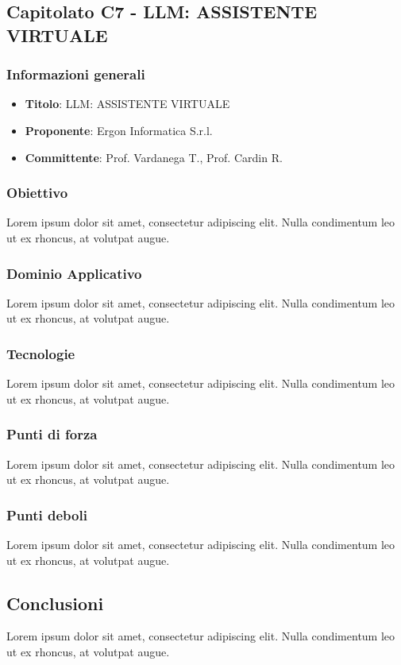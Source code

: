 \subsection{Capitolato C7 - LLM: ASSISTENTE VIRTUALE}
     \subsubsection{Informazioni generali}
        \begin{itemize}
            \item \textbf{Titolo}: LLM: ASSISTENTE VIRTUALE
            \item \textbf{Proponente}: Ergon Informatica S.r.l.
            \item \textbf{Committente}: Prof. Vardanega T., Prof. Cardin R.
        \end{itemize}
    \subsubsection{Obiettivo}
    Lorem ipsum dolor sit amet, consectetur adipiscing elit. Nulla condimentum leo ut ex rhoncus, at volutpat augue.
     \subsubsection{Dominio Applicativo}
    Lorem ipsum dolor sit amet, consectetur adipiscing elit. Nulla condimentum leo ut ex rhoncus, at volutpat augue.
    \subsubsection{Tecnologie}
    Lorem ipsum dolor sit amet, consectetur adipiscing elit. Nulla condimentum leo ut ex rhoncus, at volutpat augue.
    \subsubsection{Punti di forza}
    Lorem ipsum dolor sit amet, consectetur adipiscing elit. Nulla condimentum leo ut ex rhoncus, at volutpat augue.
    \subsubsection{Punti deboli}
    Lorem ipsum dolor sit amet, consectetur adipiscing elit. Nulla condimentum leo ut ex rhoncus, at volutpat augue.
    \subsection{Conclusioni}
    Lorem ipsum dolor sit amet, consectetur adipiscing elit. Nulla condimentum leo ut ex rhoncus, at volutpat augue.